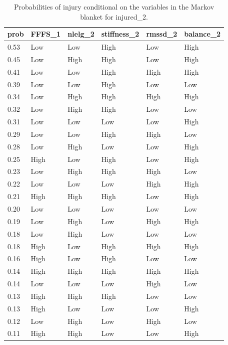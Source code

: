 \documentclass[
  english,
  man,floatsintext]{apa6}
\begin{document}
\begin{table}[H]

\begin{center}
\begin{threeparttable}

\caption{\label{tab:unnamed-chunk-9}Probabilities of injury conditional on the variables in the Markov blanket for injured\_2.}

\begin{tabular}{llllll}
\toprule
prob & \multicolumn{1}{c}{FFFS\_1} & \multicolumn{1}{c}{nlelg\_2} & \multicolumn{1}{c}{stiffness\_2} & \multicolumn{1}{c}{rmssd\_2} & \multicolumn{1}{c}{balance\_2}\\
\midrule
0.53 & Low & Low & High & Low & High\\
0.45 & Low & High & High & Low & High\\
0.41 & Low & Low & High & High & High\\
0.39 & Low & Low & High & Low & Low\\
0.34 & Low & High & High & High & High\\
0.32 & Low & High & High & Low & Low\\
0.31 & Low & Low & Low & Low & High\\
0.29 & Low & Low & High & High & Low\\
0.28 & Low & High & Low & Low & High\\
0.25 & High & Low & High & Low & High\\
0.23 & Low & High & High & High & Low\\
0.22 & Low & Low & Low & High & High\\
0.21 & High & High & High & Low & High\\
0.20 & Low & Low & Low & Low & Low\\
0.19 & Low & High & Low & High & High\\
0.18 & Low & High & Low & Low & Low\\
0.18 & High & Low & High & High & High\\
0.16 & High & Low & High & Low & Low\\
0.14 & High & High & High & High & High\\
0.14 & Low & Low & Low & High & Low\\
0.13 & High & High & High & Low & Low\\
0.13 & High & Low & Low & Low & High\\
0.12 & Low & High & Low & High & Low\\
0.11 & High & High & Low & Low & High\\

\end{tabular}
\end{threeparttable}
\end{center}
\end{table}
\end{document}
